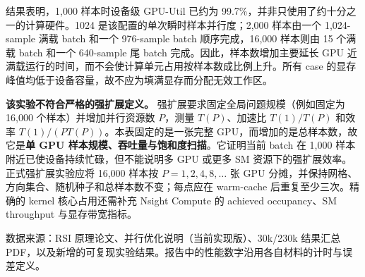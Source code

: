 \documentclass[11pt,a4paper]{article}
\begin{document}
结果表明，1,000 样本时设备级 GPU-Util 已约为 99.7\%，并非只使用了约十分之一的计算硬件。1024 是该配置的单次瞬时样本并行度；2,000 样本由一个 1,024-sample 满载 batch 和一个 976-sample batch 顺序完成，16,000 样本则由 15 个满载 batch 和一个 640-sample 尾 batch 完成。因此，样本数增加主要延长 GPU 近满载运行的时间，而不会使计算单元占用按样本数成比例上升。所有 case 的显存峰值均低于设备容量，故不应为填满显存而分配无效工作区。

\textbf{该实验不符合严格的强扩展定义。} 强扩展要求固定全局问题规模（例如固定为 16,000 个样本）并增加并行资源数 $P$，测量 $T(P)$、加速比 $T(1)/T(P)$ 和效率 $T(1)/(P T(P))$。本表固定的是一张完整 GPU，而增加的是总样本数，故它是\textbf{单 GPU 样本规模、吞吐量与饱和度扫描}。它证明当前 batch 在 1,000 样本附近已使设备持续忙碌，但不能说明多 GPU 或更多 SM 资源下的强扩展效率。正式强扩展实验应将 16,000 样本按 $P=1,2,4,8,\ldots$ 张 GPU 分摊，并保持网格、方向集合、随机种子和总样本数不变；每点应在 warm-cache 后重复至少三次。精确的 kernel 核心占用还需补充 Nsight Compute 的 achieved occupancy、SM throughput 与显存带宽指标。

\vfill
{\small\color{gray} 数据来源：RSI 原理论文、并行优化说明（当前实现版）、30k/230k 结果汇总 PDF，以及新增的可复现实验结果。报告中的性能数字沿用各自材料的计时与误差定义。}
\end{document}

